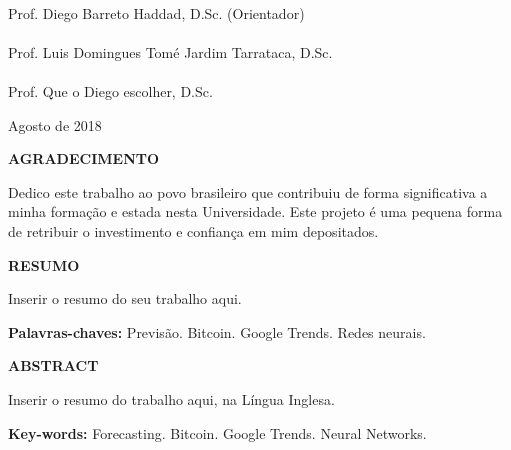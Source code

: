 {\center
\HRule \\
Prof. Diego Barreto Haddad, D.Sc. (Orientador) \\[0.4cm]
\HRule \\
Prof. Luis Domingues Tomé Jardim Tarrataca, D.Sc.\\[0.4cm]
\HRule \\
Prof. Que o Diego escolher, D.Sc.  \\[1.5cm]


\begin{center}
{Agosto de 2018}
\end{center}


}



\newpage


%



\begin{center}
\textbf{\large  AGRADECIMENTO}
\end{center}
      \vspace{0.5cm}

Dedico este trabalho ao povo brasileiro que contribuiu de forma significativa a minha formação e estada nesta Universidade. Este projeto é uma pequena forma de retribuir o investimento e confiança em mim depositados.



\newpage


\begin{center}
\textbf{\large RESUMO}
\end{center}
      \vspace{0.5cm}

Inserir o resumo do seu trabalho aqui.

\begin{flushleft}
{\bf Palavras-chaves:} Previsão. Bitcoin. Google Trends. Redes neurais.
\end{flushleft}

\newpage

\begin{center}
\textbf{\large ABSTRACT}
\end{center}
\vspace{0.5cm}

Inserir o resumo do trabalho aqui, na Língua Inglesa.


\begin{flushleft}
{\bf Key-words:} Forecasting. Bitcoin. Google Trends. Neural Networks.
\end{flushleft}
